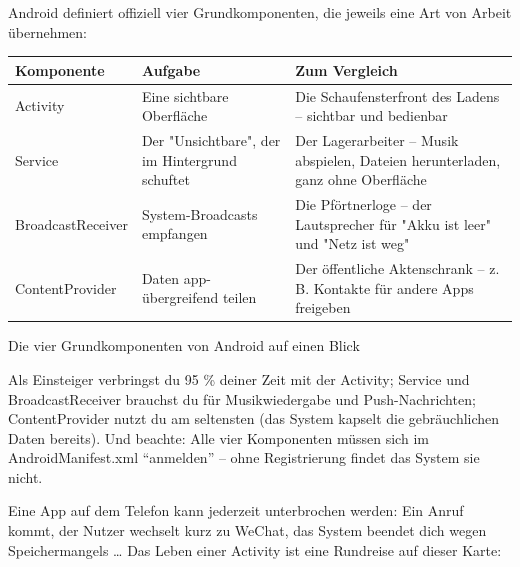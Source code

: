 


Android definiert offiziell vier Grundkomponenten, die jeweils eine Art von Arbeit übernehmen:

\begin{center}
\begin{tabularx}{\linewidth}{|X|X|X|}
\hline
\textbf{Komponente} & \textbf{Aufgabe} & \textbf{Zum Vergleich} \tabularnewline
\hline
Activity & Eine sichtbare Oberfläche & Die Schaufensterfront des Ladens – sichtbar und bedienbar \tabularnewline
Service & Der "Unsichtbare", der im Hintergrund schuftet & Der Lagerarbeiter – Musik abspielen, Dateien herunterladen, ganz ohne Oberfläche \tabularnewline
BroadcastReceiver & System-Broadcasts empfangen & Die Pförtnerloge – der Lautsprecher für "Akku ist leer" und "Netz ist weg" \tabularnewline
ContentProvider & Daten app-übergreifend teilen & Der öffentliche Aktenschrank – z. B. Kontakte für andere Apps freigeben \tabularnewline
\hline
\end{tabularx}
\end{center}

\begin{center}\small\color{gray}Die vier Grundkomponenten von Android auf einen Blick\end{center}

Als Einsteiger verbringst du 95 \% deiner Zeit mit der Activity; Service und BroadcastReceiver brauchst du für Musikwiedergabe und Push-Nachrichten; ContentProvider nutzt du am seltensten (das System kapselt die gebräuchlichen Daten bereits). Und beachte: Alle vier Komponenten müssen sich im AndroidManifest.xml “anmelden” – ohne Registrierung findet das System sie nicht.


Eine App auf dem Telefon kann jederzeit unterbrochen werden: Ein Anruf kommt, der Nutzer wechselt kurz zu WeChat, das System beendet dich wegen Speichermangels … Das Leben einer Activity ist eine Rundreise auf dieser Karte:

